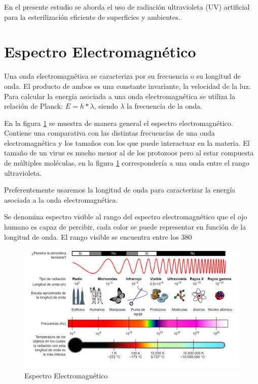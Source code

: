\documentclass[letterpaper,11pt]{article}
\begin{document}
En el presente estudio se aborda el uso de radiación ultravioleta (UV) artificial para la esterilización eficiente de superficies y ambientes.

\section{Espectro Electromagnético}  

Una onda electromagnética se caracteriza por su frecuencia o su longitud de onda. El producto de ambos es una constante invariante, la velocidad de la luz. Para calcular la energía asociada a una onda electromagnética se utiliza la relación de Planck: $E= h * \lambda$, siendo $\lambda$ la frecuencia de la onda.

En la figura \ref{espectro} se muestra de manera general el espectro electromagnético. Contiene una comparativa con las distintas frecuencias de una onda electromagnética y los tamaños con los que puede interactuar en la materia. 
El tamaño de un virus es mucho menor al de los protozoos pero al estar compuesta de múltiples moléculas, en la figura \ref{espectro} correspondería a una onda entre el rango ultravioleta.

Preferentemente usaremos la longitud de onda para caracterizar la energía asociada a la onda electromagnética.

Se denomina espectro visible al rango del espectro electromagnético que el ojo humano es capaz de percibir, cada color se puede representar en función de la longitud de onda. El rango visible se encuentra entre los 380  

\begin{figure}[hbt!]
\includegraphics[width=\textwidth]{espectro.png}
\caption{Espectro Electromagnético}
\label{espectro}

\end{figure}




\end{document}
